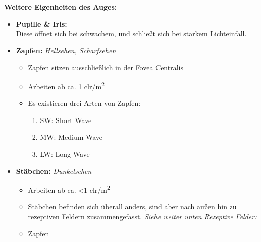 \textbf{Weitere Eigenheiten des Auges:} \\
\begin{itemize}
\item \textbf{Pupille \& Iris:}\\
Diese öffnet sich bei schwachem, und schließt sich bei starkem Lichteinfall.

\item \textbf{Zapfen:} \textit{Hellsehen, Scharfsehen} 

\begin{itemize}
	\item Zapfen sitzen ausschließlich in der Fovea Centralis
	\item Arbeiten ab ca. 1 clr/m\textsuperscript{2}	
	\item Es existieren drei Arten von Zapfen:
\begin{enumerate}
	\item SW: Short Wave
	\item MW: Medium Wave
	\item LW: Long Wave
\end{enumerate}
\end{itemize}

\item \textbf{Stäbchen:}  \textit{Dunkelsehen}
\begin{itemize}
	\item Arbeiten ab ca. <1 clr/m\textsuperscript{2}
	\item Stäbchen befinden sich überall anders, sind aber nach außen hin zu rezeptiven Feldern zusammengefasst. \textit{Siehe weiter unten Rezeptive Felder: }
	\item Zapfen 
\end{itemize}
\end{itemize}


